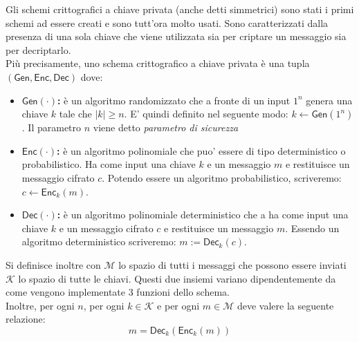 Gli schemi crittografici a chiave privata (anche detti simmetrici) sono stati i primi schemi ad essere creati e sono tutt'ora molto usati. Sono caratterizzati dalla presenza di una sola chiave che viene utilizzata sia per criptare un messaggio sia per decriptarlo.\\
Più precisamente, uno schema crittografico a chiave privata è una tupla $(\mathsf{Gen}, \mathsf{Enc}, \mathsf{Dec})$ dove:
\begin{itemize}
    \item{\textbf{$\mathsf{Gen}(\cdot)$:} è un algoritmo randomizzato che a fronte di un input $1^{n}$ genera una chiave $k$ tale che $|k| \geq n$. E' quindi definito nel seguente modo: $k \leftarrow \mathsf{Gen}(1^{n})$}. Il parametro $n$ viene detto \emph{parametro di sicurezza}
    \item{\textbf{$\mathsf{Enc}(\cdot)$:} è un algoritmo polinomiale che puo' essere di tipo deterministico o probabilistico. Ha come input una chiave $k$ e un messaggio $m$ e restituisce un messaggio cifrato $c$. Potendo essere un algoritmo probabilistico, scriveremo: $c \leftarrow \mathsf{Enc}_k(m)$.}
    \item{\textbf{$\mathsf{Dec}(\cdot)$:} è un algoritmo polinomiale deterministico che a ha come input una chiave $k$ e un messaggio cifrato $c$ e restituisce un messaggio $m$. Essendo un algoritmo deterministico scriveremo: $m := \mathsf{Dec}_k(c)$.}
\end{itemize}
Si definisce inoltre con $\mathcal{M}$ lo spazio di tutti i messaggi che possono essere inviati $\mathcal{K}$ lo spazio di tutte le chiavi. Questi due insiemi variano dipendentemente da come vengono implementate 3 funzioni dello schema.\\
Inoltre, per ogni $n$, per ogni $k \in \mathcal{K}$ e per ogni $m \in \mathcal{M}$ deve valere la seguente relazione:
$$
    m = \mathsf{Dec}_k(\mathsf{Enc}_k(m))
$$

